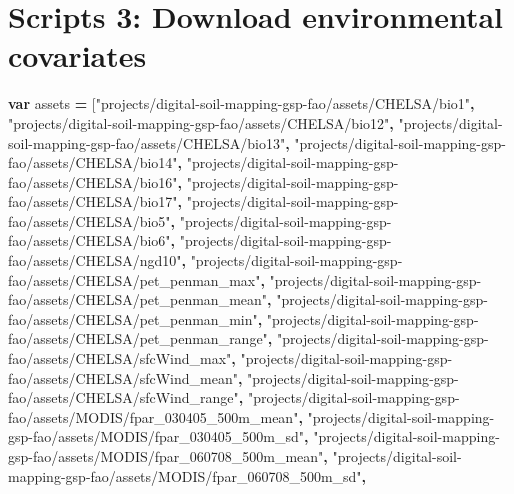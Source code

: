 \documentclass[
  10pt,
  b5paper,
  oneside]{book}
\newenvironment{Shaded}{\begin{snugshade}}{\end{snugshade}}
\newcommand{\KeywordTok}[1]{\textcolor[rgb]{0.13,0.29,0.53}{\textbf{#1}}}
\newcommand{\NormalTok}[1]{#1}
\newcommand{\OperatorTok}[1]{\textcolor[rgb]{0.81,0.36,0.00}{\textbf{#1}}}
\newcommand{\StringTok}[1]{\textcolor[rgb]{0.31,0.60,0.02}{#1}}
\begin{document}
\hypertarget{scripts-3-download-environmental-covariates}{%
\section*{Scripts 3: Download environmental covariates}\label{scripts-3-download-environmental-covariates}}

\begin{Shaded}
\begin{Highlighting}[]
\KeywordTok{var}\NormalTok{ assets }\OperatorTok{=}\NormalTok{ [}\StringTok{"projects/digital{-}soil{-}mapping{-}gsp{-}fao/assets/CHELSA/bio1"}\OperatorTok{,}
\StringTok{"projects/digital{-}soil{-}mapping{-}gsp{-}fao/assets/CHELSA/bio12"}\OperatorTok{,}
\StringTok{"projects/digital{-}soil{-}mapping{-}gsp{-}fao/assets/CHELSA/bio13"}\OperatorTok{,}
\StringTok{"projects/digital{-}soil{-}mapping{-}gsp{-}fao/assets/CHELSA/bio14"}\OperatorTok{,}
\StringTok{"projects/digital{-}soil{-}mapping{-}gsp{-}fao/assets/CHELSA/bio16"}\OperatorTok{,}
\StringTok{"projects/digital{-}soil{-}mapping{-}gsp{-}fao/assets/CHELSA/bio17"}\OperatorTok{,}
\StringTok{"projects/digital{-}soil{-}mapping{-}gsp{-}fao/assets/CHELSA/bio5"}\OperatorTok{,}
\StringTok{"projects/digital{-}soil{-}mapping{-}gsp{-}fao/assets/CHELSA/bio6"}\OperatorTok{,}
\StringTok{"projects/digital{-}soil{-}mapping{-}gsp{-}fao/assets/CHELSA/ngd10"}\OperatorTok{,}
\StringTok{"projects/digital{-}soil{-}mapping{-}gsp{-}fao/assets/CHELSA/pet\_penman\_max"}\OperatorTok{,}
\StringTok{"projects/digital{-}soil{-}mapping{-}gsp{-}fao/assets/CHELSA/pet\_penman\_mean"}\OperatorTok{,}
\StringTok{"projects/digital{-}soil{-}mapping{-}gsp{-}fao/assets/CHELSA/pet\_penman\_min"}\OperatorTok{,}
\StringTok{"projects/digital{-}soil{-}mapping{-}gsp{-}fao/assets/CHELSA/pet\_penman\_range"}\OperatorTok{,}
\StringTok{"projects/digital{-}soil{-}mapping{-}gsp{-}fao/assets/CHELSA/sfcWind\_max"}\OperatorTok{,}
\StringTok{"projects/digital{-}soil{-}mapping{-}gsp{-}fao/assets/CHELSA/sfcWind\_mean"}\OperatorTok{,}
\StringTok{"projects/digital{-}soil{-}mapping{-}gsp{-}fao/assets/CHELSA/sfcWind\_range"}\OperatorTok{,}
\StringTok{"projects/digital{-}soil{-}mapping{-}gsp{-}fao/assets/MODIS/fpar\_030405\_500m\_mean"}\OperatorTok{,}
\StringTok{"projects/digital{-}soil{-}mapping{-}gsp{-}fao/assets/MODIS/fpar\_030405\_500m\_sd"}\OperatorTok{,}
\StringTok{"projects/digital{-}soil{-}mapping{-}gsp{-}fao/assets/MODIS/fpar\_060708\_500m\_mean"}\OperatorTok{,}
\StringTok{"projects/digital{-}soil{-}mapping{-}gsp{-}fao/assets/MODIS/fpar\_060708\_500m\_sd"}\OperatorTok{,}

\end{Highlighting}
\end{Shaded}
\end{document}
